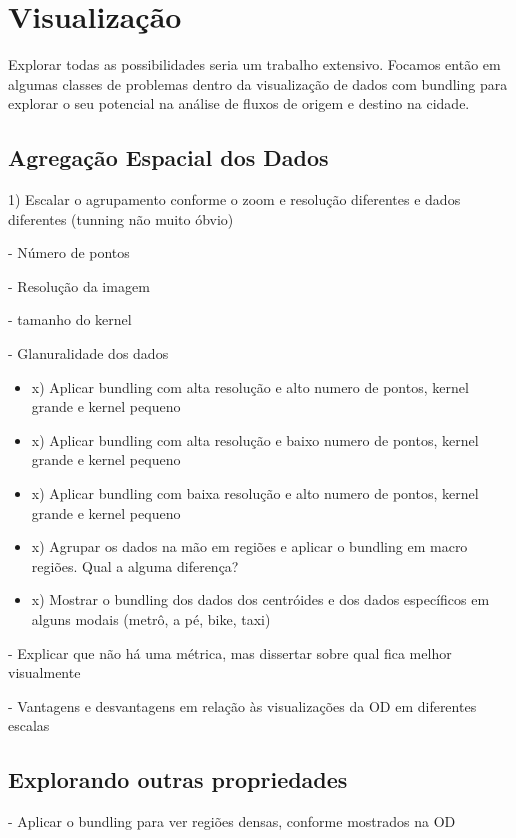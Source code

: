 \section{Visualização}

  Explorar todas as possibilidades seria um trabalho extensivo. Focamos
então em algumas classes de problemas dentro da visualização de dados
com bundling para explorar o seu potencial na análise de fluxos de origem e
destino na cidade.

\subsection{Agregação Espacial dos Dados}

1) Escalar o agrupamento conforme o zoom e resolução diferentes e dados diferentes (tunning não muito óbvio)

	- Número de pontos

	- Resolução da imagem

	- tamanho do kernel

	- Glanuralidade dos dados

  \begin{itemize}
    \item x) Aplicar bundling com alta resolução e alto numero de pontos, kernel grande e kernel pequeno
    \item x) Aplicar bundling com alta resolução e baixo numero de pontos, kernel grande e kernel pequeno
    \item x) Aplicar bundling com baixa resolução e alto numero de pontos, kernel grande e kernel pequeno
    \item x) Agrupar os dados na mão em regiões e aplicar o bundling em macro regiões. Qual a alguma diferença?
    \item x) Mostrar o bundling dos dados dos centróides e dos dados específicos em alguns modais (metrô, a pé, bike, taxi)
  \end{itemize}

	- Explicar que não há uma métrica, mas dissertar sobre qual fica melhor visualmente

	- Vantagens e desvantagens em relação às visualizações da OD em diferentes escalas

\subsection{Explorando outras propriedades}

- Aplicar o bundling para ver regiões densas, conforme mostrados na OD

